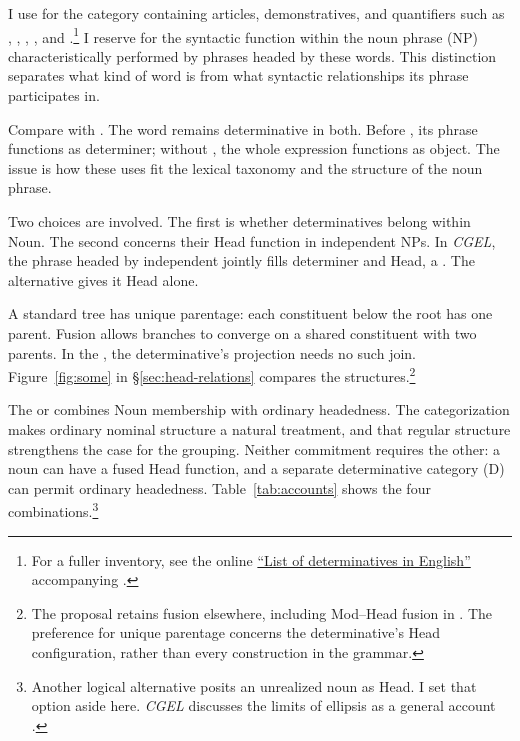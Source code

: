 \documentclass[12pt]{article}
\begin{document}
I use  for the category containing articles, demonstratives, and quantifiers such as , , , , and .\footnote{For a fuller inventory, see the online \href{https://www.cambridge.org/highereducation/api/resources/2AC8DF5CA558F8A6FCDFACD0EAF8EA08}{\enquote{List of determinatives in English}} accompanying \textcite{Huddleston2021}.} I reserve  for the syntactic function within the noun phrase (NP) characteristically performed by phrases headed by these words. This distinction separates what kind of word  is from what syntactic relationships its phrase participates in.

Compare  with . The word  remains determinative in both. Before , its phrase functions as determiner; without , the whole expression functions as object. The issue is how these uses fit the lexical taxonomy and the structure of the noun phrase.

Two choices are involved. The first is whether determinatives belong within Noun. The second concerns their Head function in independent NPs. In \textit{CGEL}, the phrase headed by independent  jointly fills determiner and Head, a  \citep[410--412]{huddleston2002}. The alternative gives it Head alone.

A standard tree has unique parentage: each constituent below the root has one parent. Fusion allows branches to converge on a shared constituent with two parents. In the , the determinative's projection needs no such join. Figure~\ref{fig:some} in §\ref{sec:head-relations} compares the structures.\footnote{The proposal retains fusion elsewhere, including Mod--Head fusion in . The preference for unique parentage concerns the determinative's Head configuration, rather than every construction in the grammar.}

The  or  combines Noun membership with ordinary headedness. The categorization makes ordinary nominal structure a natural treatment, and that regular structure strengthens the case for the grouping. Neither commitment requires the other: a noun can have a fused Head function, and a separate determinative category (D) can permit ordinary headedness. Table~\ref{tab:accounts} shows the four combinations.\footnote{Another logical alternative posits an unrealized noun as Head. I set that option aside here. \textit{CGEL} discusses the limits of ellipsis as a general account \citep[420--421]{huddleston2002}.}
\end{document}
